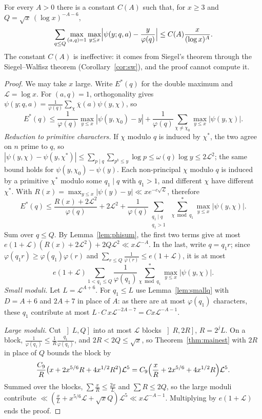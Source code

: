 \begin{theorem}\label{thm:bv}
For every $A>0$ there is a constant $C(A)$ such that, for $x\ge3$ and $Q=\sqrt x\,(\log x)^{-A-6}$,
\[
\sum_{q\le Q}\max_{(a,q)=1}\max_{y\le x}\Bigl|\psi(y;q,a)-\frac y{\varphi(q)}\Bigr|\le C(A)\frac x{(\log x)^A}.
\]
The constant $C(A)$ is ineffective: it comes from Siegel's theorem through the Siegel--Walfisz theorem (Corollary~\ref{cor:sw}), and the proof cannot compute it.
\end{theorem}
\begin{proof}
We may take $x$ large. Write $E^*(q)$ for the double maximum and $\mathcal L=\log x$. For $(a,q)=1$, orthogonality gives $\psi(y;q,a)=\frac1{\varphi(q)}\sum_\chi\overline\chi(a)\psi(y,\chi)$, so
\[
E^*(q)\le\frac1{\varphi(q)}\max_{y\le x}|\psi(y,\chi_0)-y|+\frac1{\varphi(q)}\sum_{\chi\ne\chi_0}\max_{y\le x}|\psi(y,\chi)|.
\]
\emph{Reduction to primitive characters.} If $\chi$ modulo $q$ is induced by $\chi^*$, the two agree on $n$ prime to $q$, so $|\psi(y,\chi)-\psi(y,\chi^*)|\le\sum_{p\mid q}\sum_{p^k\le y}\log p\le\omega(q)\log y\le2\mathcal L^2$; the same bound holds for $\psi(y,\chi_0)-\psi(y)$. Each non-principal $\chi$ modulo $q$ is induced by a primitive $\chi^*$ modulo some $q_1\mid q$ with $q_1>1$, and different $\chi$ have different $\chi^*$. With $R(x)=\max_{y\le x}|\psi(y)-y|\ll xe^{-c\sqrt{\mathcal L}}$, therefore
\[
E^*(q)\le\frac{R(x)+2\mathcal L^2}{\varphi(q)}+2\mathcal L^2+\frac1{\varphi(q)}\sum_{\substack{q_1\mid q\\q_1>1}}\ \sum^*_{\chi\bmod q_1}\max_{y\le x}|\psi(y,\chi)|.
\]
Sum over $q\le Q$. By Lemma~\ref{lem:phisum}, the first two terms give at most $e(1+\mathcal L)(R(x)+2\mathcal L^2)+2Q\mathcal L^2\ll x\mathcal L^{-A}$. In the last, write $q=q_1r$; since $\varphi(q_1r)\ge\varphi(q_1)\varphi(r)$ and $\sum_{r\le Q}\frac1{\varphi(r)}\le e(1+\mathcal L)$, it is at most
\[
e(1+\mathcal L)\sum_{1<q_1\le Q}\frac1{\varphi(q_1)}\sum^*_{\chi\bmod q_1}\max_{y\le x}|\psi(y,\chi)|.
\]
\emph{Small moduli.} Let $L=\mathcal L^{A+6}$. For $q_1\le L$ use Lemma~\ref{lem:smallq} with $D=A+6$ and $2A+7$ in place of $A$: as there are at most $\varphi(q_1)$ characters, these $q_1$ contribute at most $L\cdot C\,x\mathcal L^{-2A-7}=Cx\mathcal L^{-A-1}$.

\emph{Large moduli.} Cut $\left]L,Q\right]$ into at most $\mathcal L$ blocks $\left]R,2R\right]$, $R=2^jL$. On a block, $\frac1{\varphi(q_1)}\le\frac1R\frac{q_1}{\varphi(q_1)}$, and $2R<2Q\le\sqrt x$, so Theorem~\ref{thm:mainest} with $2R$ in place of $Q$ bounds the block by
\[
\frac{C_9}R\bigl(x+2x^{5/6}R+4x^{1/2}R^2\bigr)\mathcal L^5=C_9\Bigl(\frac xR+2x^{5/6}+4x^{1/2}R\Bigr)\mathcal L^5.
\]
Summed over the blocks, $\sum\frac xR\le\frac{2x}L$ and $\sum R\le2Q$, so the large moduli contribute $\ll(\frac xL+x^{5/6}\mathcal L+\sqrt xQ)\mathcal L^5\ll x\mathcal L^{-A-1}$. Multiplying by $e(1+\mathcal L)$ ends the proof.
\end{proof}


